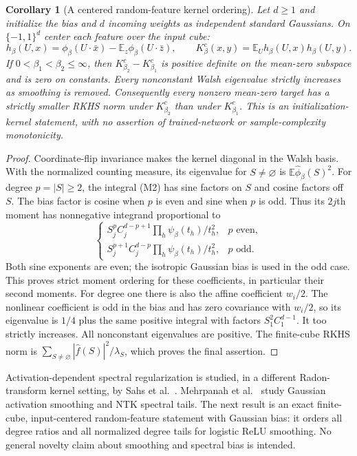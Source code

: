 \documentclass[11pt]{article}
\newtheorem{corollary}[theorem]{Corollary}
\newcommand{\E}{\mathbb E}\newcommand{\R}{\mathbb R}
\begin{document}
\begin{corollary}[A centered random-feature kernel ordering]
Let $d\ge1$ and initialize the bias and $d$ incoming weights as
independent standard Gaussians. On $\{-1,1\}^d$ center each feature
over the input cube:
\[
 h_\beta(U,x)=\phi_\beta(U\cdot\bar x)
                         -\E_z\phi_\beta(U\cdot\bar z),\qquad
 K_\beta^c(x,y)=\E_U h_\beta(U,x)h_\beta(U,y).
\]
If $0<\beta_1<\beta_2\le\infty$, then
$K_{\beta_2}^c-K_{\beta_1}^c$ is positive definite on the mean-zero
subspace and is zero on constants. Every nonconstant Walsh eigenvalue
strictly increases as smoothing is removed.
Consequently every nonzero mean-zero target has a strictly smaller
RKHS norm under $K_{\beta_2}^c$ than under $K_{\beta_1}^c$.
This is an initialization-kernel statement, with no assertion of
trained-network or sample-complexity monotonicity.
\end{corollary}
\begin{proof}
Coordinate-flip invariance makes the kernel diagonal in the Walsh
basis. With the normalized counting measure, its eigenvalue for
$S\ne\varnothing$ is $\E\widehat\phi_\beta(S)^2$.
For degree $p=|S|\ge2$, the integral (M2) has sine factors on $S$
and cosine factors off $S$. The bias factor is cosine when $p$ is
even and sine when $p$ is odd. Thus its $2j$th moment has nonnegative
integrand proportional to
\[
 \begin{cases}
 S_j^p C_j^{d-p+1}\prod_h\psi_\beta(t_h)/t_h^2,&p\text{ even},\\
 S_j^{p+1}C_j^{d-p}\prod_h\psi_\beta(t_h)/t_h^2,&p\text{ odd}.
 \end{cases}
\]
Both sine exponents are even; the isotropic Gaussian bias is used
in the odd case. This proves strict moment ordering for these
coefficients, in particular their second moments.
For degree one there is also the affine coefficient $w_i/2$.
The nonlinear coefficient is odd in the bias and has zero covariance
with $w_i/2$, so its eigenvalue is $1/4$ plus the same positive
integral with factors $S_1^2C_1^{d-1}$. It too strictly increases.
All nonconstant eigenvalues are positive. The finite-cube RKHS norm
is $\sum_{S\ne\varnothing}|\widehat f(S)|^2/\lambda_S$,
which proves the final assertion.
\end{proof}


Activation-dependent spectral regularization is studied, in a different
Radon-transform kernel setting, by Sahs et al.~\cite{sahs}.
Mehrpanah et al.~\cite{mehrpanah} study Gaussian activation smoothing
and NTK spectral tails. The next result is an exact finite-cube,
input-centered random-feature statement with Gaussian bias: it orders
all degree ratios and all normalized degree tails for logistic ReLU
smoothing. No general novelty claim about smoothing and spectral bias
is intended.
\end{document}
